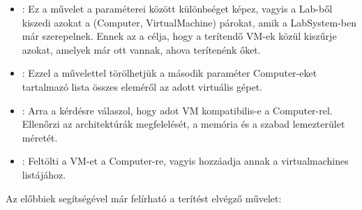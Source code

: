 \begin{itemize}
  \item {}: Ez a művelet a paraméterei között különbséget képez, vagyis a Lab-ből kiszedi azokat a (Computer, VirtualMachine) párokat, amik a LabSystem-ben már szerepelnek. Ennek az a célja, hogy a terítendő VM-ek közül kiszűrje azokat, amelyek már ott vannak, ahova terítenénk őket.
  \item {}: Ezzel a művelettel törölhetjük a második paraméter Computer-eket tartalmazó lista összes eleméről az adott virtuális gépet.
  \item {}: Arra a kérdésre válaszol, hogy adot VM kompatibilis-e a Computer-rel. Ellenőrzi az architektúrák megfelelését, a memória és a szabad lemezterület méretét.
  \item {}: Feltölti a VM-et a Computer-re, vagyis hozzáadja annak a virtualmachines listájához.
\end{itemize}

Az előbbiek segítségével már felírható a terítést elvégző  művelet:\vspace{0.5cm}

\\
\indent {}\\
\indent \indent {}\\
\indent \indent \indent	{}\\
\indent \indent \indent	{}\\
\indent \indent \indent \indent	{}


